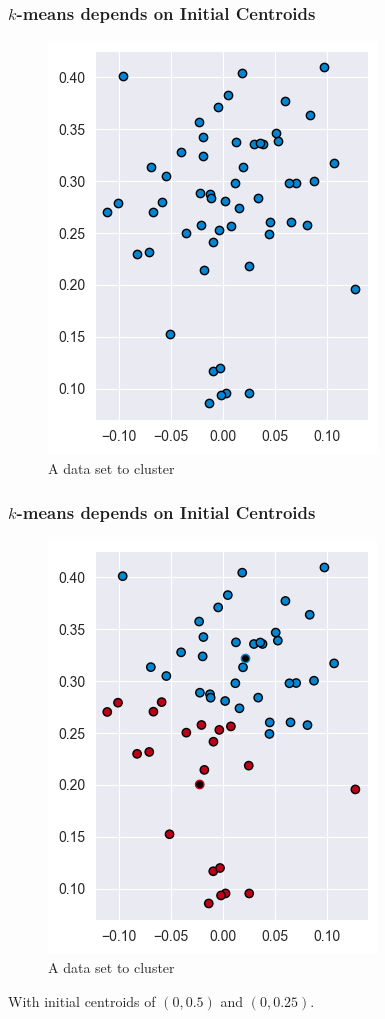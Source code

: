 \documentclass[smaller]{beamer}
\theoremstyle{example}
\begin{document}
\begin{frame}
    \frametitle{$k$-means depends on Initial Centroids}
    
    \begin{figure}
        \begin{center}
            \includegraphics[height=0.5\textheight]{../../Images/kmeans_balldata0.png}
        \end{center}
        \caption{A data set to cluster}
    \end{figure}
\phantom{With initial centroids of $(0,0.5)$ and $(0, 0.25)$}
\vfill
\end{frame}

\begin{frame}
    \frametitle{$k$-means depends on Initial Centroids}
    
    \begin{figure}
        \begin{center}
            \includegraphics[height=0.5\textheight]{../../Images/kmeans_balldata1.png}
        \end{center}
        \caption{A data set to cluster}
    \end{figure}
With initial centroids of $(0,0.5)$ and $(0, 0.25)$.
\vfill
\end{frame}
\end{document}
